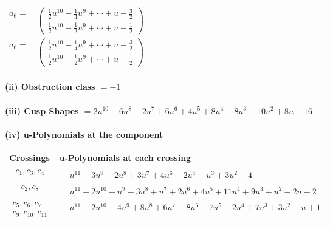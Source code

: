 \documentclass[1p]{elsarticle_modified}
\theoremstyle{definition}
\begin{document}
\begin{tabular}{m{7pt} m{180pt} m{7pt} m{180pt} }
\flushright $a_{6}=$&$\begin{pmatrix}\frac{1}{2} u^{10}-\frac{1}{4} u^9+\cdots+u-\frac{3}{2}\\\frac{1}{2} u^{10}-\frac{1}{2} u^9+\cdots+u-\frac{1}{2}\end{pmatrix}$\\ \flushright $a_{6}=$&$\begin{pmatrix}\frac{1}{2} u^{10}-\frac{1}{4} u^9+\cdots+u-\frac{3}{2}\\\frac{1}{2} u^{10}-\frac{1}{2} u^9+\cdots+u-\frac{1}{2}\end{pmatrix}$\\&\end{tabular}
\flushleft \textbf{(ii) Obstruction class $= -1$}\\~\\
\flushleft \textbf{(iii) Cusp Shapes $= 2 u^{10}-6 u^8-2 u^7+6 u^6+4 u^5+8 u^4-8 u^3-10 u^2+8 u-16$}\\~\\
\newpage\renewcommand{\arraystretch}{1}
\flushleft \textbf{(iv) u-Polynomials at the component}\newline \\
\begin{tabular}{m{50pt}|m{274pt}}
Crossings & \hspace{64pt}u-Polynomials at each crossing \\
\hline $$\begin{aligned}c_{1},c_{3},c_{4}\end{aligned}$$&$\begin{aligned}
&u^{11}-3 u^9-2 u^8+3 u^7+4 u^6-2 u^4- u^3+3 u^2-4
\end{aligned}$\\
\hline $$\begin{aligned}c_{2},c_{8}\end{aligned}$$&$\begin{aligned}
&u^{11}+2 u^{10}- u^9-3 u^8+u^7+2 u^6+4 u^5+11 u^4+9 u^3+u^2-2 u-2
\end{aligned}$\\
\hline $$\begin{aligned}c_{5},c_{6},c_{7}\\c_{9},c_{10},c_{11}\end{aligned}$$&$\begin{aligned}
&u^{11}-2 u^{10}-4 u^9+8 u^8+6 u^7-8 u^6-7 u^5-2 u^4+7 u^3+3 u^2- u+1
\end{aligned}$\\
\hline
\end{tabular}\\~\\
\end{document}
